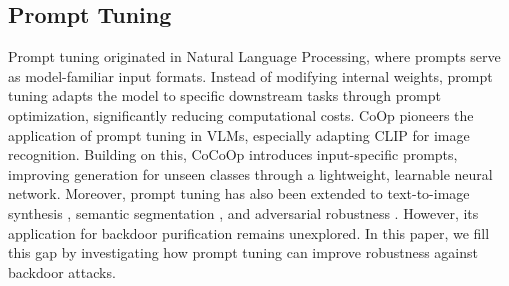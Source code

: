 \subsection{Prompt Tuning}
Prompt tuning originated in Natural Language Processing, where prompts serve as model-familiar input formats. Instead of modifying internal weights, prompt tuning adapts the model to specific downstream tasks through prompt optimization, significantly reducing computational costs. CoOp \cite{zhou2022learning} pioneers the application of prompt tuning in VLMs, especially adapting CLIP for image recognition. Building on this, CoCoOp \cite{zhou2022conditional} introduces input-specific prompts, improving generation for unseen classes through a lightweight, learnable neural network. Moreover, prompt tuning has also been extended to text-to-image synthesis \cite{tao2023galip}, semantic segmentation \cite{zhou2023zegclip}, and adversarial robustness \cite{li2024one}. However, its application for backdoor purification remains unexplored. In this paper, we fill this gap by investigating how prompt tuning can improve robustness against backdoor attacks.
